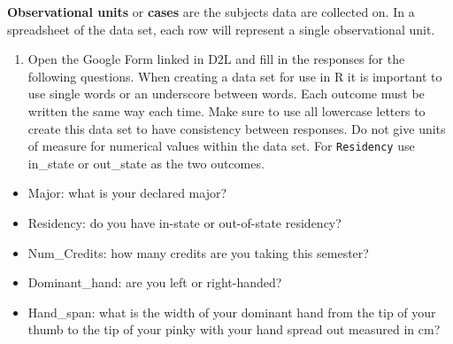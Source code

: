 \documentclass[
]{report}
\providecommand{\tightlist}{%
  \setlength{\itemsep}{0pt}\setlength{\parskip}{0pt}}
\begin{document}
\textbf{Observational units} or \textbf{cases} are the subjects data are collected on. In a spreadsheet of the data set, each row will represent a single observational unit.

\newpage

\begin{enumerate}
\def\labelenumi{\arabic{enumi}.}
\tightlist
\item
  Open the Google Form linked in D2L and fill in the responses for the following questions. When creating a data set for use in R it is important to use single words or an underscore between words. Each outcome must be written the same way each time. Make sure to use all lowercase letters to create this data set to have consistency between responses. Do not give units of measure for numerical values within the data set. For \texttt{Residency} use in\_state or out\_state as the two outcomes.
\end{enumerate}

\begin{itemize}
\tightlist
\item
  Major: what is your declared major?
\end{itemize}

\vspace{0.2in}

\begin{itemize}
\tightlist
\item
  Residency: do you have in-state or out-of-state residency?
\end{itemize}

\vspace{0.2in}

\begin{itemize}
\tightlist
\item
  Num\_Credits: how many credits are you taking this semester?
\end{itemize}

\vspace{0.2in}

\begin{itemize}
\tightlist
\item
  Dominant\_hand: are you left or right-handed?
\end{itemize}

\vspace{0.2in}

\begin{itemize}
\tightlist
\item
  Hand\_span: what is the width of your dominant hand from the tip of your thumb to the tip of your pinky with your hand spread out measured in cm?
\end{itemize}
\end{document}
